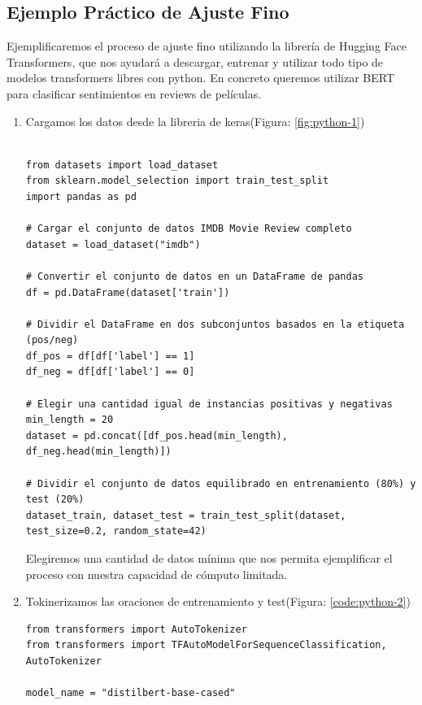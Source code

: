 \subsection{Ejemplo Práctico de Ajuste Fino}
      Ejemplificaremos el proceso de ajuste fino utilizando la librería de Hugging Face Transformers, que nos ayudará a descargar, entrenar y utilizar todo tipo de modelos transformers libres con python.
      En concreto queremos utilizar BERT para clasificar sentimientos en reviews de películas.
      \begin{enumerate}
          \item Cargamos los datos desde la libreria de keras(Figura: \ref{fig:python-1})
            \begin{lstlisting}[style=mystyle, label=fig:python-1,caption=Carga de datos]

from datasets import load_dataset
from sklearn.model_selection import train_test_split
import pandas as pd

# Cargar el conjunto de datos IMDB Movie Review completo
dataset = load_dataset("imdb")

# Convertir el conjunto de datos en un DataFrame de pandas
df = pd.DataFrame(dataset['train'])

# Dividir el DataFrame en dos subconjuntos basados en la etiqueta (pos/neg)
df_pos = df[df['label'] == 1]
df_neg = df[df['label'] == 0]

# Elegir una cantidad igual de instancias positivas y negativas
min_length = 20
dataset = pd.concat([df_pos.head(min_length), df_neg.head(min_length)])

# Dividir el conjunto de datos equilibrado en entrenamiento (80%) y test (20%)
dataset_train, dataset_test = train_test_split(dataset, test_size=0.2, random_state=42)

            \end{lstlisting}
Elegiremos una cantidad de datos mínima que nos permita ejemplificar el proceso con nuestra capacidad de cómputo limitada.

\newpage
          \item Tokinerizamos las oraciones de entrenamiento y test(Figura: \ref{code:python-2})
          \begin{lstlisting}[style=mystyle, label=code:python-2,caption=Tokinerización de datos]
from transformers import AutoTokenizer
from transformers import TFAutoModelForSequenceClassification, AutoTokenizer

model_name = "distilbert-base-cased"


\end{lstlisting}
\end{enumerate}

